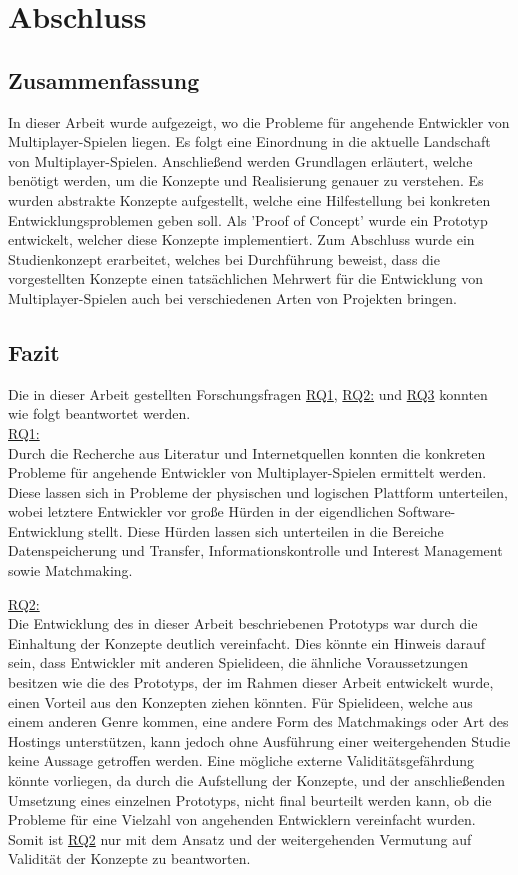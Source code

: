 \chapter{Abschluss}
\label{sec:abschluss}

\section{Zusammenfassung}

In dieser Arbeit wurde aufgezeigt, wo die Probleme für angehende Entwickler von Multiplayer-Spielen liegen. Es folgt eine Einordnung in die aktuelle Landschaft von Multiplayer-Spielen. Anschließend werden Grundlagen erläutert, welche benötigt werden, um die Konzepte und Realisierung genauer zu verstehen. Es wurden abstrakte Konzepte aufgestellt, welche eine Hilfestellung bei konkreten Entwicklungsproblemen geben soll. Als 'Proof of Concept' wurde ein Prototyp entwickelt, welcher diese Konzepte implementiert. Zum Abschluss wurde ein Studienkonzept erarbeitet, welches bei Durchführung beweist, dass die vorgestellten Konzepte einen tatsächlichen Mehrwert für die Entwicklung von Multiplayer-Spielen auch bei verschiedenen Arten von Projekten bringen.

\section{Fazit}

Die in dieser Arbeit gestellten Forschungsfragen \hyperref[RQ1]{RQ1}, \hyperref[RQ2]{RQ2:} und \hyperref[RQ3]{RQ3} konnten wie folgt beantwortet werden. \\
\hyperref[RQ1]{RQ1:} \\
Durch die Recherche aus Literatur und Internetquellen konnten die konkreten Probleme für angehende Entwickler von Multiplayer-Spielen ermittelt werden. Diese lassen sich in Probleme der physischen und logischen Plattform unterteilen, wobei letztere Entwickler vor große Hürden in der eigendlichen Software-Entwicklung stellt. Diese Hürden lassen sich unterteilen in die Bereiche Datenspeicherung und Transfer, Informationskontrolle und Interest Management sowie Matchmaking.

\hyperref[RQ2]{RQ2:} \\
Die Entwicklung des in dieser Arbeit beschriebenen Prototyps war durch die Einhaltung der Konzepte deutlich vereinfacht. Dies könnte ein Hinweis darauf sein, dass Entwickler mit anderen Spielideen, die ähnliche Voraussetzungen besitzen wie die des Prototyps, der im Rahmen dieser Arbeit entwickelt wurde, einen Vorteil aus den Konzepten ziehen könnten. Für Spielideen, welche aus einem anderen Genre kommen, eine andere Form des Matchmakings oder Art des Hostings unterstützen, kann jedoch ohne Ausführung einer weitergehenden Studie keine Aussage getroffen werden. Eine mögliche externe Validitätsgefährdung könnte vorliegen, da durch die Aufstellung der Konzepte, und der anschließenden Umsetzung eines einzelnen Prototyps, nicht final beurteilt werden kann, ob die Probleme für eine Vielzahl von angehenden Entwicklern vereinfacht wurden. Somit ist \hyperref[RQ2]{RQ2} nur mit dem Ansatz und der weitergehenden Vermutung auf Validität der Konzepte zu beantworten.


